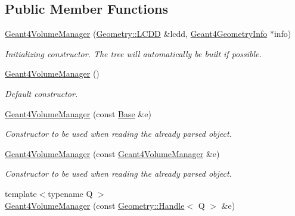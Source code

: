 \subsection*{Public Member Functions}
\begin{DoxyCompactItemize}
\item 
\hyperlink{class_d_d4hep_1_1_simulation_1_1_geant4_volume_manager_a4e434e1e81dec955ac925c4bb26cb420}{Geant4VolumeManager} (\hyperlink{class_d_d4hep_1_1_geometry_1_1_l_c_d_d}{Geometry::LCDD} \&lcdd, \hyperlink{class_d_d4hep_1_1_simulation_1_1_geant4_geometry_info}{Geant4GeometryInfo} $\ast$info)
\begin{DoxyCompactList}\small\item\em Initializing constructor. The tree will automatically be built if possible. \item\end{DoxyCompactList}\item 
\hyperlink{class_d_d4hep_1_1_simulation_1_1_geant4_volume_manager_aaa373dec70850279290ca95c852d19db}{Geant4VolumeManager} ()
\begin{DoxyCompactList}\small\item\em Default constructor. \item\end{DoxyCompactList}\item 
\hyperlink{class_d_d4hep_1_1_simulation_1_1_geant4_volume_manager_a7f1f31944a14314f82c3e82cc39e46ea}{Geant4VolumeManager} (const \hyperlink{class_d_d4hep_1_1_handle}{Base} \&e)
\begin{DoxyCompactList}\small\item\em Constructor to be used when reading the already parsed object. \item\end{DoxyCompactList}\item 
\hyperlink{class_d_d4hep_1_1_simulation_1_1_geant4_volume_manager_a8939c354de0d28fbf310fbac7c0c1f2b}{Geant4VolumeManager} (const \hyperlink{class_d_d4hep_1_1_simulation_1_1_geant4_volume_manager}{Geant4VolumeManager} \&e)
\begin{DoxyCompactList}\small\item\em Constructor to be used when reading the already parsed object. \item\end{DoxyCompactList}\item 
{\footnotesize template$<$typename Q $>$ }\\\hyperlink{class_d_d4hep_1_1_simulation_1_1_geant4_volume_manager_a06b38722fe8d71c1ac3f58fb10c84081}{Geant4VolumeManager} (const \hyperlink{class_d_d4hep_1_1_handle}{Geometry::Handle}$<$ Q $>$ \&e)

\end{DoxyCompactItemize}
